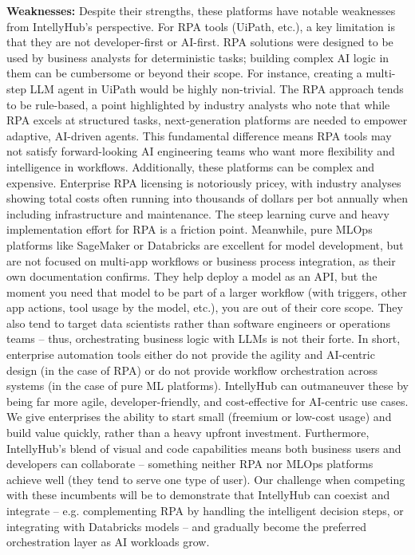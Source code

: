\documentclass[11pt, a4paper, oneside]{article}
\begin{document}
\textbf{Weaknesses:} Despite their strengths, these platforms have notable weaknesses from IntellyHub's perspective. For RPA tools (UiPath, etc.), a key limitation is that they are not developer-first or AI-first. RPA solutions were designed to be used by business analysts for deterministic tasks; building complex AI logic in them can be cumbersome or beyond their scope. For instance, creating a multi-step LLM agent in UiPath would be highly non-trivial. The RPA approach tends to be rule-based, a point highlighted by industry analysts who note that while RPA excels at structured tasks, next-generation platforms are needed to empower adaptive, AI-driven agents\cite{forresterRPAvsAI}. This fundamental difference means RPA tools may not satisfy forward-looking AI engineering teams who want more flexibility and intelligence in workflows. Additionally, these platforms can be complex and expensive. Enterprise RPA licensing is notoriously pricey, with industry analyses showing total costs often running into thousands of dollars per bot annually when including infrastructure and maintenance. The steep learning curve and heavy implementation effort for RPA is a friction point. Meanwhile, pure MLOps platforms like SageMaker or Databricks are excellent for model development, but are not focused on multi-app workflows or business process integration, as their own documentation confirms\cite{awsSagemaker}. They help deploy a model as an API, but the moment you need that model to be part of a larger workflow (with triggers, other app actions, tool usage by the model, etc.), you are out of their core scope. They also tend to target data scientists rather than software engineers or operations teams – thus, orchestrating business logic with LLMs is not their forte. In short, enterprise automation tools either do not provide the agility and AI-centric design (in the case of RPA) or do not provide workflow orchestration across systems (in the case of pure ML platforms). IntellyHub can outmaneuver these by being far more agile, developer-friendly, and cost-effective for AI-centric use cases. We give enterprises the ability to start small (freemium or low-cost usage) and build value quickly, rather than a heavy upfront investment. Furthermore, IntellyHub's blend of visual and code capabilities means both business users and developers can collaborate – something neither RPA nor MLOps platforms achieve well (they tend to serve one type of user). Our challenge when competing with these incumbents will be to demonstrate that IntellyHub can coexist and integrate – e.g. complementing RPA by handling the intelligent decision steps, or integrating with Databricks models – and gradually become the preferred orchestration layer as AI workloads grow.
\end{document}

